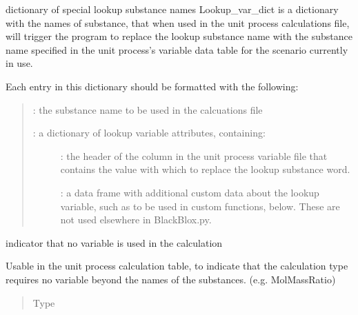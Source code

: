 \documentclass[a4paper,10pt,english]{sphinxmanual}
\begin{document}
\begin{fulllineitems}
\label{\detokenize{dataconfig:dataconfig.lookup_var_dict}}
dictionary of special lookup substance names
Lookup\_var\_dict is a dictionary with the names of substance, that when used
in the unit process calculations file, will trigger the program to replace
the lookup substance name with the substance name specified in the unit
process’s variable data table for the scenario currently in use.

Each entry in this dictionary should be formatted with the following:
\begin{quote}

 : the substance name to be used in the calcuations file
\begin{description}
\item[{ : a dictionary of lookup variable attributes, containing:}] \leavevmode
{} : the header of the column in the unit process
variable file that contains the value with which to replace
the lookup substance word.

 : a data frame with additional custom data
about the lookup variable, such as to be used in custom functions,
below. These are not used elsewhere in BlackBlox.py.

\end{description}
\end{quote}

\end{fulllineitems}


\begin{fulllineitems}
\label{\detokenize{dataconfig:dataconfig.no_var}}
indicator that no variable is used in the calculation

Usable in the unit process calculation table, to indicate that the
calculation type requires no variable beyond the names of the substances.
(e.g. MolMassRatio)
\begin{quote}\begin{description}
\item[{Type}] \leavevmode
{}

\end{description}\end{quote}

\end{fulllineitems}
\end{document}
